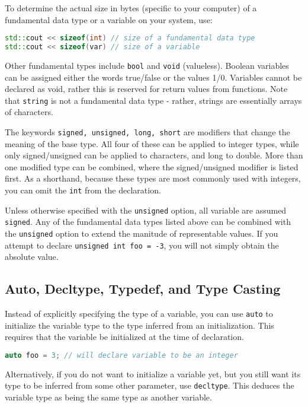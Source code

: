 \documentclass[10pt]{article}
\begin{document}
To determine the actual size in bytes (specific to your computer) of a fundamental data type or a variable on your system, use:

\begin{lstlisting}[language=C++]
std::cout << sizeof(int) // size of a fundamental data type
std::cout << sizeof(var) // size of a variable
\end{lstlisting}

Other fundamental types include \texttt{bool} and \texttt{void} (valueless). Boolean variables can be assigned either the words true/false or the values 1/0. Variables cannot be declared as void, rather this is reserved for return values from functions. Note that \texttt{string} is not a fundamental data type - rather, strings are essentially arrays of characters.

The keywords \texttt{signed, unsigned, long, short} are modifiers that change the meaning of the base type. All four of these can be applied to integer types, while only signed/unsigned can be applied to characters, and long to double. More than one modified type can be combined, where the signed/unsigned modifier is listed first. As a shorthand, because these types are most commonly used with integers, you can omit the \texttt{int} from the declaration.

Unless otherwise specified with the \texttt{unsigned} option, all variable are assumed \texttt{signed}. Any of the fundamental data types listed above can be combined with the \texttt{unsigned} option to extend the manitude of representable values. If you attempt to declare \texttt{unsigned int foo = -3}, you will not simply obtain the absolute value.

\subsection{Auto, Decltype, Typedef, and Type Casting}

Instead of explicitly specifying the type of a variable, you can use \texttt{auto} to initialize the variable type to the type inferred from an initialization. This requires that the variable be initialized at the time of declaration.

\begin{lstlisting}[language=C++]
auto foo = 3; // will declare variable to be an integer
\end{lstlisting}

Alternatively, if you do not want to initialize a variable yet, but you still want its type to be inferred from some other parameter, use \texttt{decltype}. This deduces the variable type as being the same type as another variable.
\end{document}
